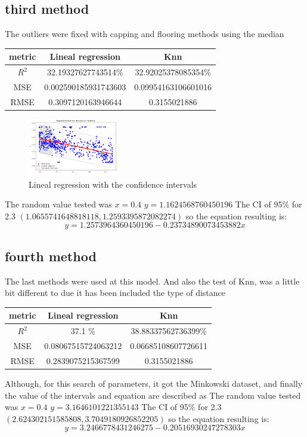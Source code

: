 \documentclass{article}
\begin{document}
\subsection{third method}
The outliers were fixed with capping and flooring methods using the median
\begin{center}
  \begin{tabular}{|c|c|c|}
    \hline
     metric & Lineal regression & Knn \\ \hline
     $R^2$& 32.19327627743514\%&32.92025378085354\%\\
     MSE& 0.002590185931743603&0.09954163106601016\\
     RMSE&0.3097120163946644&0.3155021886\\
     \hline

  \end{tabular}
\end{center}
\begin{figure}[h]
  \includegraphics[width=0.35\textwidth]{model_3_3.png}
  \caption{Lineal regression with the confidence intervals}

  \label{fig:example_intervals_3}
\end{figure}
The random value tested was $x=0.4$ $ y=1.1624568760450196$
The CI of  95\% for 2.3 $(1.0655741648818118, 1.2593395872082274)$
so the equation resulting is: $$y=1.2573964360450196 -0.23734890073453882x $$

\subsection{fourth method}
The last methods were used at this model. And also the test of Knn, was a little bit different to due it has been included the type of distance
\begin{center}
  \begin{tabular}{|c|c|c|}
    \hline
     metric & Lineal regression & Knn \\ \hline
     $R^2$& 37.1 \%&38.88337562736399\%\\
     MSE& 0.08067515724063212&0.06685108607726611\\
     RMSE&0.2839075215367599&0.3155021886\\
     \hline
    
  \end{tabular}
\end{center}
Although, for this search of parameters, it got the Minkowski dataset, and finally the value of the intervals and equation are described as 
The random value tested was $x=0.4$ $ y=3.1646101221355143$
The CI of  95\% for 2.3 $(2.624302151585808, 3.7049180926852205)$
so the equation resulting is: $$y=3.2466778431246275 -0.20516930247278303x $$
\end{document}
